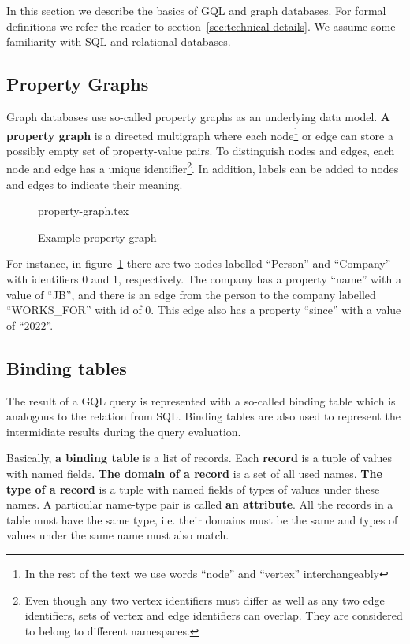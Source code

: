 \documentclass[14pt]{constructor-thesis}
\theoremstyle{definition}
\begin{document}
In this section we describe the basics of GQL and graph databases. For formal definitions we refer the reader to section~\ref{sec:technical-details}. We assume some familiarity with SQL and relational databases.

\subsection{Property Graphs}
\label{section:intro-property-graphs}

Graph databases use so-called property graphs as an underlying data model. \textbf{A property graph} is a directed multigraph where each node\footnote{In the rest of the text we use words ``node'' and ``vertex'' interchangeably} or edge can store a possibly empty set of property-value pairs. To distinguish nodes and edges, each node and edge has a unique identifier\footnote{Even though any two vertex identifiers must differ as well as any two edge identifiers, sets of vertex and edge identifiers can overlap. They are considered to belong to different namespaces.}. In addition, labels can be added to nodes and edges to indicate their meaning.

\begin{figure}[b]
  \centering
  
  {property-graph.tex}

  \caption{Example property graph}
  \label{fig:property-graph}
\end{figure}

For instance, in figure~\ref{fig:property-graph} there are two nodes labelled ``Person'' and ``Company'' with identifiers 0 and 1, respectively. The company has a property ``name'' with a value of ``JB'', and there is an edge from the person to the company labelled ``WORKS\_FOR'' with id of 0. This edge also has a property ``since'' with a value of ``2022''.

\subsection{Binding tables}
\label{section:intro-binding-tables}

The result of a GQL query is represented with a so-called binding table which is analogous to the relation from SQL. Binding tables are also used to represent the intermidiate results during the query evaluation.

Basically, \textbf{a binding table} is a list of records. Each \textbf{record} is a tuple of values with named fields. \textbf{The domain of a record} is a set of all used names. \textbf{The type of a record} is a tuple with named fields of types of values under these names. A particular name-type pair is called \textbf{an attribute}. All the records in a table must have the same type, i.e. their domains must be the same and types of values under the same name must also match.
\end{document}
